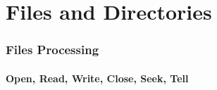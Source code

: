 
\part{Files and Directories}  %



\section{Files Processing}

\subsection{Open, Read, Write, Close, Seek, Tell}



